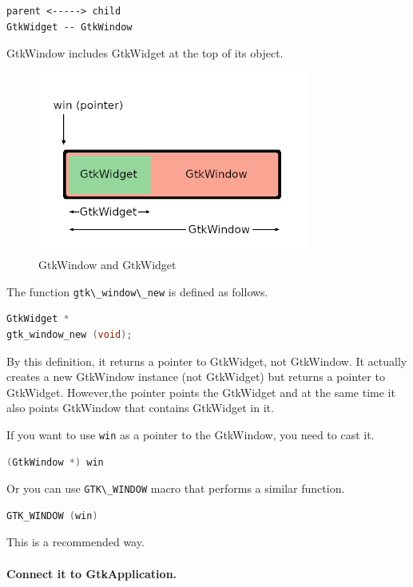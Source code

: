 \begin{lstlisting}
parent <-----> child
GtkWidget -- GtkWindow
\end{lstlisting}

GtkWindow includes GtkWidget at the top of its object.

\begin{figure}
\centering
\includegraphics[width=9cm,height=6cm]{../image/window_widget.png}
\caption{GtkWindow and GtkWidget}
\end{figure}

The function \passthrough{\lstinline!gtk\_window\_new!} is defined as
follows.

\begin{lstlisting}[language=C]
GtkWidget *
gtk_window_new (void);
\end{lstlisting}

By this definition, it returns a pointer to GtkWidget, not GtkWindow. It
actually creates a new GtkWindow instance (not GtkWidget) but returns a
pointer to GtkWidget. However,the pointer points the GtkWidget and at
the same time it also points GtkWindow that contains GtkWidget in it.

If you want to use \passthrough{\lstinline!win!} as a pointer to the
GtkWindow, you need to cast it.

\begin{lstlisting}[language=C]
(GtkWindow *) win
\end{lstlisting}

Or you can use \passthrough{\lstinline!GTK\_WINDOW!} macro that performs
a similar function.

\begin{lstlisting}[language=C]
GTK_WINDOW (win)
\end{lstlisting}

This is a recommended way.

\hypertarget{connect-it-to-gtkapplication.}{%
\paragraph{Connect it to
GtkApplication.}\label{connect-it-to-gtkapplication.}}

